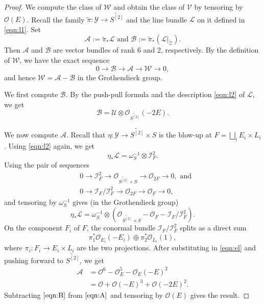 \documentclass[12pt,reqno]{amsart}
\renewcommand{\to}{{\longrightarrow}}
\numberwithin{equation}{section}
\renewcommand{\O}{\mathcal O}
\newcommand{\td}{\widetilde}
\begin{document}
\begin{proof}
  We compute the class of $\mathcal W$ and obtain the class of $\mathcal V$ by tensoring by $\O(E)$.
  Recall the family $\widetilde \pi \colon \mathcal Y \to \widetilde{S^{[2]}}$ and the line bundle $\mathcal L$ on it defined in \eqref{eqn:l1}.
  Set
  \[ \mathcal A := \widetilde{\pi}_* \mathcal L \text{ and } \mathcal B := \widetilde{\pi}_* \left( \mathcal L|_{\widetilde{\mathcal Z}} \right).\]
  Then $\mathcal A$ and $\mathcal B$ are vector bundles of rank 6 and 2, respectively.
  By the definition of $\mathcal W$, we have the exact sequence
  \[ 0 \to \mathcal B \to \mathcal A \to \mathcal W \to 0,\]
  and hence $\mathcal W = \mathcal A - \mathcal B$ in the Grothendieck group.
  
  We first compute $\mathcal B$.
  By the push-pull formula and the description \eqref{eqn:l2} of $\mathcal L$, we get
  \begin{equation}\label{eqn:B}
    \mathcal B = \mathcal U \otimes \O_{\widetilde{S^{[2]}}}(-2E).
  \end{equation}
  
  We now compute $\mathcal A$.
  Recall that $\eta \colon \mathcal Y \to \widetilde{S^{[2]}} \times S$ is the blow-up at $F = \bigsqcup_i E_i \times L_i$.
  Using \eqref{eqn:l2} again, we get
  \[
    \eta_* \mathcal L = \omega_S^{-1} \otimes \mathcal I^2_{F}.
  \]
  Using the pair of sequences
  \begin{equation}
    \label{eq:seqA}
    \begin{split}
      &0 \to \mathcal{I}^2_{F} \to \O_{\td{S^{[2]}} \times S} \to \O_{2F} \to 0, \text{ and}\\
      &0 \to \mathcal{I}_{F}/\mathcal{I}_{F}^{2} \to \O_{2F} \to \O_{F} \to 0,
    \end{split}
  \end{equation}
  and tensoring by $\omega_S^{-1}$ gives (in the Grothendieck group)
  \begin{equation}\label{eqn:el}
    \eta_* \mathcal L = \omega_S^{-1} \otimes \left(\O_{\widetilde{S^{[2]}} \times S} - \O_F - \mathcal{I}_F / \mathcal{I}^2_F\right).
  \end{equation}
  On the component $F_i$ of $F$, the conormal bundle $\mathcal{I}_F / \mathcal{I}^2_F$ splits as a direct sum
  \[ \pi_1^*\O_{E_i}(-E_i) \oplus \pi_2^*\O_{L_i}(1),\]
  where $\pi_i \colon F_i \to E_i \times L_i$ are the two projections.
  After substituting in \eqref{eqn:el} and pushing forward to $\widetilde{S^{[2]}}$, we get
  \begin{equation}\label{eqn:A}
    \begin{split}
      \mathcal A &= \O^6- \O_E^{5}- \O_E(-E)^{2}\\
      &= \O + \O(-E)^3 + \O(-2E)^2.
    \end{split}
  \end{equation}
  Subtracting $\eqref{eqn:B}$ from $\eqref{eqn:A}$ and tensoring by $\O(E)$ gives the result.
\end{proof}
\end{document}
